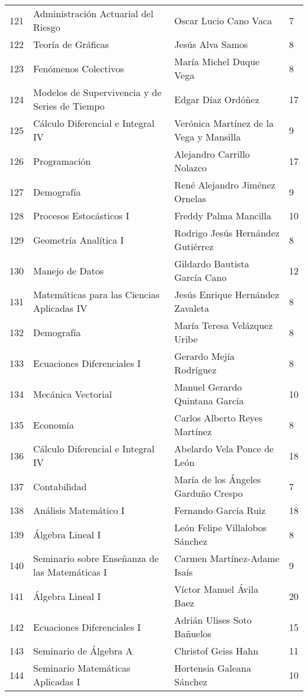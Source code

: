 \begin{table}[ht]
\begin{tabular}{rlll}
  121 & Administración Actuarial del Riesgo & Oscar Lucio Cano Vaca & 7 \\ 
  122 & Teoría de Gráficas & Jesús Alva Samos & 8 \\ 
  123 & Fenómenos Colectivos & María Michel Duque Vega & 8 \\ 
  124 & Modelos de Supervivencia y de Series de Tiempo & Edgar Díaz Ordóñez & 17 \\ 
  125 & Cálculo Diferencial e Integral IV & Verónica Martínez de la Vega y Mansilla & 9 \\ 
  126 & Programación & Alejandro Carrillo Nolazco & 17 \\ 
  127 & Demografía & René Alejandro Jiménez Ornelas & 9 \\ 
  128 & Procesos Estocásticos I & Freddy Palma Mancilla & 10 \\ 
  129 & Geometría Analítica I & Rodrigo Jesús Hernández Gutiérrez & 8 \\ 
  130 & Manejo de Datos & Gildardo Bautista García Cano & 12 \\ 
  131 & Matemáticas para las Ciencias Aplicadas IV & Jesús Enrique Hernández Zavaleta & 8 \\ 
  132 & Demografía & María Teresa Velázquez Uribe & 8 \\ 
  133 & Ecuaciones Diferenciales I & Gerardo Mejía Rodríguez & 8 \\ 
  134 & Mecánica Vectorial & Manuel Gerardo Quintana García & 10 \\ 
  135 & Economía & Carlos Alberto Reyes Martínez & 8 \\ 
  136 & Cálculo Diferencial e Integral IV & Abelardo Vela Ponce de León & 18 \\ 
  137 & Contabilidad & María de los Ángeles Garduño Crespo & 7 \\ 
  138 & Análisis Matemático I & Fernando García Ruiz & 18 \\ 
  139 & Álgebra Lineal I & León Felipe Villalobos Sánchez & 8 \\ 
  140 & Seminario sobre Enseñanza de las Matemáticas I & Carmen Martínez-Adame Isaís & 9 \\ 
  141 & Álgebra Lineal I & Víctor Manuel Ávila Baez & 20 \\ 
  142 & Ecuaciones Diferenciales I & Adrián Ulises Soto Bañuelos & 15 \\ 
  143 & Seminario de Álgebra A & Christof Geiss Hahn & 11 \\ 
  144 & Seminario Matemáticas Aplicadas I & Hortensia Galeana Sánchez & 10 \\ 

\end{tabular}
\end{table}
